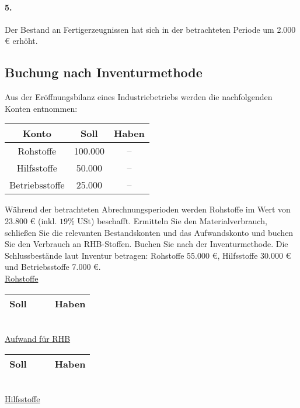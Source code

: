 \documentclass[paper=a4, fontsize=11pt]{scrartcl}
\numberwithin{equation}{section}
\numberwithin{figure}{section}
\numberwithin{table}{section}
\begin{document}
{\paragraph{5.}

Der Bestand an Fertigerzeugnissen hat sich in der betrachteten Periode um 2.000 € erhöht. \\


\subsection{Buchung nach Inventurmethode}

Aus der Eröffnungsbilanz eines Industriebetriebs werden die nachfolgenden Konten entnommen: \\

\begin{tabular}{c|cc}
Konto & Soll & Haben \\
\hline
Rohstoffe & 100.000 & -- \\
\hline
Hilfsstoffe & 50.000 & -- \\
\hline
Betriebsstoffe & 25.000 & --\\
\end{tabular}

Während der betrachteten Abrechnungsperioden werden Rohstoffe im Wert von 23.800 € (inkl. $19 \%$ USt) beschafft. Ermitteln Sie den Materialverbrauch, schließen Sie die relevanten Bestandskonten und das Aufwandskonto und buchen Sie den Verbrauch an RHB-Stoffen. Buchen Sie nach der Inventurmethode. Die Schlussbestände laut Inventur betragen: Rohstoffe 55.000 €, Hilfsstoffe 30.000 € und Betriebsstoffe 7.000 €. \\

\underline{Rohstoffe}

\begin{tabular}{cc|cc}
\hline
Soll & & & Haben \\
\hline
\end{tabular}
\\

\underline{Aufwand für RHB}

\begin{tabular}{cc|cc}
\hline
Soll & & & Haben \\
\hline
\end{tabular}
\\

\underline{Hilfsstoffe}

}
\end{document}
